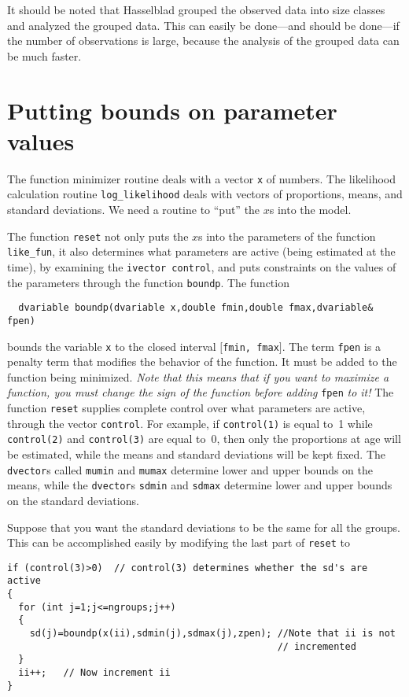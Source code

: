 \documentclass{admbmanual}
\begin{document}
It should be noted that Hasselblad grouped the observed data into size classes
and analyzed the grouped data. This can easily be done---and should be done---if
the number of observations is large, because the analysis of the grouped data
can be much faster.

\section{Putting bounds on parameter values}

The function minimizer routine deals with a vector \texttt{x} of numbers. The
likelihood calculation routine \texttt{log\_likelihood} deals with vectors of
proportions, means, and standard deviations. We need a routine to ``put'' the
$x$s into the model.


The function \texttt{reset} not only puts the $x$s into the parameters of the
function \texttt{like\_fun}, it also determines what parameters are active
(being estimated at the time), by examining the \texttt{ivector control}, and
puts constraints on the values of the parameters through the function
\texttt{boundp}. The function
\begin{lstlisting}
  dvariable boundp(dvariable x,double fmin,double fmax,dvariable& fpen)
\end{lstlisting}
bounds the variable \texttt{x} to the closed interval
$[$\texttt{fmin, fmax}$]$.
The term \texttt{fpen} is a penalty term that modifies the behavior of the
function. It must be added to the function being minimized. \textit{Note that
  this means that if you want to maximize a function, you must change the sign
  of the function before adding} \texttt{fpen} \textit{to it!} The function
\texttt{reset} supplies complete control over what parameters are active,
through the vector \texttt{control}. For example, if \texttt{control(1)} is
equal to~1 while \texttt{control(2)} and \texttt{control(3)} are equal to~0,
then only the proportions at age will be estimated, while the means and standard
deviations will be kept fixed. The \texttt{dvector}s called \texttt{mumin} and
\texttt{mumax} determine lower and upper bounds on the means, while the
\texttt{dvector}s \texttt{sdmin} and \texttt{sdmax} determine lower and upper
bounds on the standard deviations.

Suppose that you want the standard deviations to be the same for all the groups.
This can be accomplished easily by modifying the last part of \texttt{reset} to
\begin{lstlisting}
if (control(3)>0)  // control(3) determines whether the sd's are active
{
  for (int j=1;j<=ngroups;j++)
  {
    sd(j)=boundp(x(ii),sdmin(j),sdmax(j),zpen); //Note that ii is not
                                                // incremented
  }
  ii++;   // Now increment ii
}
\end{lstlisting}
\end{document}

